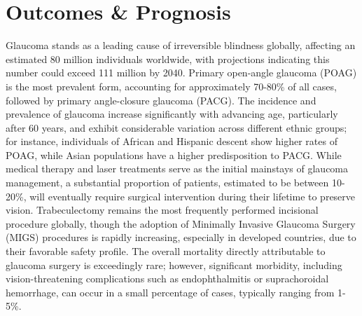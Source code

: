 \section*{Outcomes \& Prognosis}
Glaucoma stands as a leading cause of irreversible blindness globally, affecting an estimated 80 million individuals worldwide, with projections indicating this number could exceed 111 million by 2040. Primary open-angle glaucoma (POAG) is the most prevalent form, accounting for approximately 70-80\% of all cases, followed by primary angle-closure glaucoma (PACG). The incidence and prevalence of glaucoma increase significantly with advancing age, particularly after 60 years, and exhibit considerable variation across different ethnic groups; for instance, individuals of African and Hispanic descent show higher rates of POAG, while Asian populations have a higher predisposition to PACG. While medical therapy and laser treatments serve as the initial mainstays of glaucoma management, a substantial proportion of patients, estimated to be between 10-20\%, will eventually require surgical intervention during their lifetime to preserve vision. Trabeculectomy remains the most frequently performed incisional procedure globally, though the adoption of Minimally Invasive Glaucoma Surgery (MIGS) procedures is rapidly increasing, especially in developed countries, due to their favorable safety profile. The overall mortality directly attributable to glaucoma surgery is exceedingly rare; however, significant morbidity, including vision-threatening complications such as endophthalmitis or suprachoroidal hemorrhage, can occur in a small percentage of cases, typically ranging from 1-5\%.

